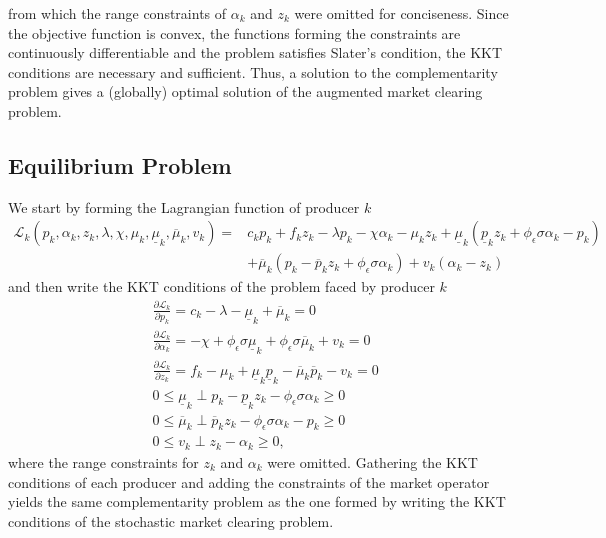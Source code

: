 \documentclass{article}
\begin{document}
from which the range constraints of $\alpha_k$ and $z_k$ were omitted for conciseness. Since the objective function is convex, the functions forming the constraints are continuously differentiable and the problem satisfies Slater's condition, the KKT conditions are necessary and sufficient. Thus, a solution to the complementarity problem gives a (globally) optimal solution of the augmented market clearing problem.
\subsection{Equilibrium Problem}
We start by forming the Lagrangian function of producer $k$
\begin{align*}
\mathcal{L}_k(p_k, \alpha_k, z_k, \lambda, \chi, \mu_k, \underline{\mu}_k, \overline{\mu}_k, v_k) =& c_k p_k + f_k z_k - \lambda p_k - \chi \alpha_k - \mu_k z_k + \underline{\mu}_k (\underline{p}_k z_k + \phi_{\epsilon} \sigma \alpha_k - p_k)\\
&+ \overline{\mu}_k (p_k - \overline{p}_k z_k + \phi_{\epsilon} \sigma \alpha_k) + v_k (\alpha_k - z_k)
\end{align*}
and then write the KKT conditions of the problem faced by producer $k$
\begin{align*}
&\frac{\partial \mathcal{L}_k}{\partial p_k} = c_k - \lambda - \underline{\mu}_k + \overline{\mu}_k = 0\\
&\frac{\partial \mathcal{L}_k}{\partial \alpha_k} = - \chi + \phi_{\epsilon} \sigma \underline{\mu}_k + \phi_{\epsilon} \sigma \overline{\mu}_k + v_k = 0\\
&\frac{\partial \mathcal{L}_k}{\partial z_k} = f_k - \mu_k + \underline{\mu}_k \underline{p}_k - \overline{\mu}_k \overline{p}_k - v_k = 0\\
&0 \le \underline{\mu}_k \perp p_k - \underline{p}_k z_k - \phi_{\epsilon} \sigma \alpha_k \ge 0\\
&0 \le \overline{\mu}_k \perp \overline{p}_k z_k - \phi_{\epsilon} \sigma \alpha_k - p_k \ge 0\\
&0\le v_k\perp z_k-\alpha_k\ge0,
\end{align*}
where the range constraints for $z_k$ and $\alpha_k$ were omitted. Gathering the KKT conditions of each producer and adding the constraints of the market operator yields the same complementarity problem as the one formed by writing the KKT conditions of the stochastic market clearing problem.


\end{document}
